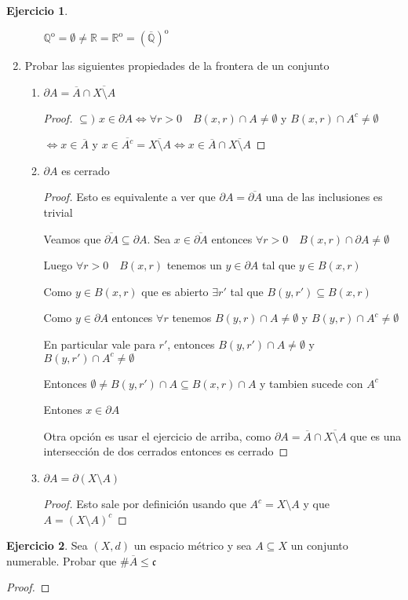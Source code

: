 \documentclass[12pt]{report}
\newcommand{\Q}{\mathbb{Q}}
\newcommand{\R}{\mathbb{R}}
\newcommand{\ol}{\overline}
\newcommand{\open}{\mathrm{o}}
\theoremstyle{definition}
\newtheorem{ej}{Ejercicio}
\begin{document}
\begin{ej}
\begin{enumerate}
\begin{enumerate}
	  $\Q^{\open} = \emptyset \neq \R = \R^{\open} = (\ol{\Q})^{\open}$
      \end{enumerate}

    \item Probar las siguientes propiedades de la frontera de un conjunto
      \begin{enumerate}
	\item $\partial A = \ol A \cap \ol{X \setminus A}$
	  \begin{proof}
	  $\subseteq )$ $x \in \partial A \iff \forall r>0 \quad B(x,r) \cap A \neq \emptyset$ y $B(x,r)\cap A^c \neq \emptyset $ 

	  $\iff x \in \ol A$ y $x \in \ol{A^c} = \ol{X \setminus A} \iff x \in \ol A \cap \ol{X \setminus A}$
	  \end{proof}
	\item $\partial A$ es cerrado
	  \begin{proof}
	    Esto es equivalente a ver que $\partial A = \ol{\partial A}$ una de las inclusiones es trivial

	    Veamos que $\ol{\partial A} \subseteq \partial A$. Sea $x \in \ol{\partial A}$ entonces $\forall r>0 \quad B(x,r) \cap \partial A \neq \emptyset$

	    Luego  $\forall r>0 \quad B(x,r) $ tenemos un $y \in \partial A$ tal que $y \in B(x,r)$

	    Como $y \in B(x,r)$ que es abierto $\exists r'$ tal que $B(y,r') \subseteq B(x,r)$

	  Como $y \in \partial A$ entonces $\forall r$ tenemos $B(y,r) \cap A \neq \emptyset$ y $B(y,r) \cap A^c \neq \emptyset$

	  En particular vale para $r'$, entonces $B(y,r') \cap A \neq \emptyset$ y $B(y,r') \cap A^c \neq \emptyset$

	  Entonces $\emptyset  \neq B(y,r') \cap A \subseteq B(x,r) \cap A$ y tambien sucede con $A^c$

	  Entones $x \in \partial A$

	  Otra opción es usar el ejercicio de arriba, como $\partial A = \ol A \cap \ol{X\setminus A}$ que es una intersección de dos cerrados entonces es cerrado 
	  \end{proof}
	\item $\partial A = \partial{(X \setminus A)}$
	  \begin{proof}
	  Esto sale por definición usando que $A^c = X \setminus A$ y que $A = (X\setminus A)^c$
	  \end{proof}
      \end{enumerate}
  \end{enumerate}
\end{ej}
\begin{ej}
	Sea $(X,d)$ un espacio métrico y sea $A \subseteq X$ un conjunto numerable. Probar que $\# \ol A \leq \mathfrak{c}$
	\begin{proof}
		
	\end{proof}
	
	
\end{ej}
\end{document}
